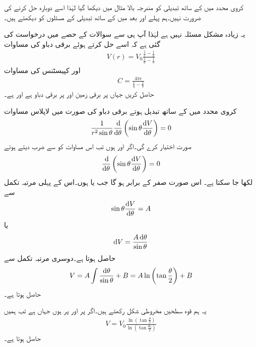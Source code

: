 کروی محدد میں  کے ساتھ تبدیلی کو مندرجہ بالا مثال میں دیکھا گیا لہٰذا اسے دوبارہ حل کرنے کی ضرورت نہیں۔ہم پہلے  اور بعد میں  کے ساتھ تبدیلی کے مسئلوں کو دیکھتے ہیں۔

یہ زیادہ مشکل مسئلہ نہیں ہے لہٰذا آپ ہی سے سوالات کے حصے میں درخواست کی گئی ہے کہ اسے حل کرتے ہوئے برقی دباو کی مساوات 
\begin{align}\label{مساوات_لاپلاس_کروی_رداسی_لاپلاسی_دباو}
V(r)=V_0 \frac{\frac{1}{r}-\frac{1}{b}}{\frac{1}{a}-\frac{1}{b}}
\end{align}
اور کپیسٹنس کی مساوات 
\begin{align}\label{مساوات_لاپلاس_کروی_رداسی_لاپلاسی_کپیسٹنس}
C=\frac{4\pi \epsilon}{\frac{1}{a}-\frac{1}{b}}
\end{align}
حاصل کریں  جہاں  پر برقی زمین اور  پر  برقی دباو ہے اور  ہے۔

کروی محدد میں  کے ساتھ تبدیل ہوتے برقی دباو کی صورت میں لاپلاس مساوات
\begin{align}
\frac{1}{r^2 \sin \theta} \frac{\dif}{\dif \theta}\left(\sin \theta \frac{\dif V}{\dif \theta}\right)=0
\end{align}
صورت اختیار کرے گی۔اگر  اور  ہوں تب اس مساوات کو  سے ضرب دیتے ہوئے
\begin{align}
\frac{\dif}{\dif \theta}\left(\sin \theta \frac{\dif V}{\dif \theta}\right)=0
\end{align}
لکھا جا سکتا ہے۔ اس صورت صفر کے برابر ہو گا جب  یا  ہوں۔اس کے پہلی مرتبہ تکمل سے
\begin{align*}
\sin \theta \frac{\dif V}{\dif \theta}=A
\end{align*}
یا
\begin{align*}
\dif V=\frac{A \dif \theta}{\sin \theta}
\end{align*}
حاصل ہوتا ہے۔دوسری مرتبہ تکمل سے
\begin{align}\label{مساوات_لاپلاس_مخروطی_حل}
V=A\int \frac{\dif \theta}{\sin \theta}+B=A \ln \left(\tan \frac{\theta}{2}\right)+B
\end{align}
حاصل ہوتا ہے۔

یہ ہم قوہ سطحیں مخروطی شکل رکھتے ہیں۔اگر  پر  اور  پر  ہوں جہاں  ہے تب ہمیں
\begin{align}\label{مساوات_لاپلاس_مخروطی_حل_ب}
V=V_0 \frac{\ln \left(\tan \frac{\theta}{2} \right)}{\ln \left(\tan \frac{\theta_0}{2} \right)}
\end{align}
حاصل ہوتا ہے۔

